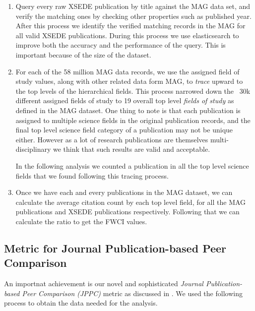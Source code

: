 \documentclass{sig-alternate}
\begin{document}
\begin{enumerate}
\item Query every raw XSEDE publication by title against the MAG data
  set, and verify the matching ones by checking other properties such
  as published year. After this process we identify the verified
  matching records in the MAG for all valid XSEDE publications.
  During this process we use elasticsearch
  \cite{gormley2015elasticsearch} to improve both the accuracy and the
  performance of the query.  This is important because of the size of
  the dataset.
\item For each of the 58 million MAG data records, we use the assigned
  field of study values, along with other related data form MAG, to
  \emph{trace} upward to the top levels of the hierarchical
  fields. This process narrowed down the ~30k different assigned
  fields of study to 19 overall top level \emph{fields of study} as
  defined in the MAG dataset.  One thing to note is that each
  publication is assigned to multiple science fields in the original
  publication records, and the final top level science field category
  of a publication may not be unique either. However as a lot of
  research publications are themselves multi-disciplinary we think
  that such results are valid and acceptable.

  In the following analysis we counted a publication in all the top
  level science fields that we found following this tracing process.

\item Once we have each and every publications in the MAG dataset, we
  can calculate the average citation count by each top level field,
  for all the MAG publications and XSEDE publications
  respectively. Following that we can calculate the ratio to get the
  FWCI values.
\end{enumerate}

\subsection{Metric for Journal Publication-based Peer Comparison} \label{S:metric}

An importnat achievement is our novel and sophisticated \emph{Journal
  Publication-based Peer Comparison (JPPC)} metric as discussed in
\cite{tas2015}. We used the following process to obtain the data
needed for the analysis.
\end{document}
